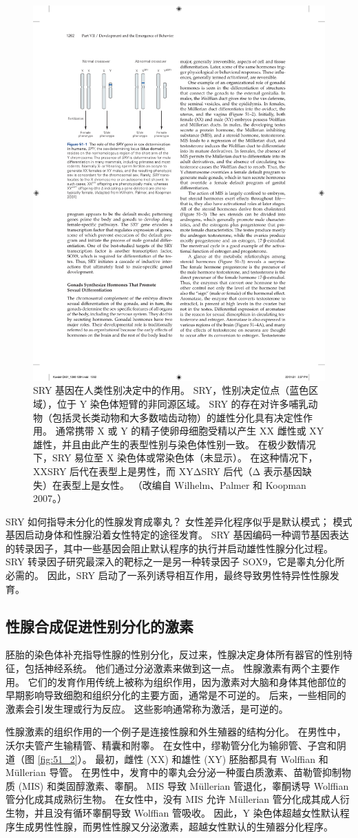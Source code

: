 \begin{figure}[htbp]
	\centering
	\includegraphics[width=0.5\linewidth]{chap51/fig_51_1}
	\caption{SRY 基因在人类性别决定中的作用。 SRY，性别决定位点（蓝色区域），位于 Y 染色体短臂的非同源区域。 SRY 的存在对许多哺乳动物（包括灵长类动物和大多数啮齿动物）的雄性分化具有决定性作用。 通常携带 X 或 Y 的精子使卵母细胞受精以产生 XX 雌性或 XY 雄性，并且由此产生的表型性别与染色体性别一致。 在极少数情况下，SRY 易位至 X 染色体或常染色体（未显示）。 在这种情况下，XXSRY 后代在表型上是男性，而 XYΔSRY 后代（Δ 表示基因缺失）在表型上是女性。 （改编自 Wilhelm、Palmer 和 Koopman 2007。）}
	\label{fig:51_1}
\end{figure}

SRY 如何指导未分化的性腺发育成睾丸？ 女性差异化程序似乎是默认模式； 模式基因启动身体和性腺沿着女性特定的途径发育。 SRY 基因编码一种调节基因表达的转录因子，其中一些基因会阻止默认程序的执行并启动雄性性腺分化过程。 SRY 转录因子研究最深入的靶标之一是另一种转录因子 SOX9，它是睾丸分化所必需的。 因此，SRY 启动了一系列诱导相互作用，最终导致男性特异性性腺发育。

\subsection{性腺合成促进性别分化的激素}
胚胎的染色体补充指导性腺的性别分化，反过来，性腺决定身体所有器官的性别特征，包括神经系统。 他们通过分泌激素来做到这一点。 性腺激素有两个主要作用。 它们的发育作用传统上被称为组织作用，因为激素对大脑和身体其他部位的早期影响导致细胞和组织分化的主要方面，通常是不可逆的。 后来，一些相同的激素会引发生理或行为反应。 这些影响通常称为激活，是可逆的。

性腺激素的组织作用的一个例子是连接性腺和外生殖器的结构分化。 在男性中，沃尔夫管产生输精管、精囊和附睾。 
在女性中，缪勒管分化为输卵管、子宫和阴道（图 \ref{fig:51_2}）。 
最初，雌性 (XX) 和雄性 (XY) 胚胎都具有 Wolffian 和 Müllerian 导管。 在男性中，发育中的睾丸会分泌一种蛋白质激素、苗勒管抑制物质 (MIS) 和类固醇激素、睾酮。 MIS 导致 Müllerian 管退化，睾酮诱导 Wolffian 管分化成其成熟衍生物。 在女性中，没有 MIS 允许 Müllerian 管分化成其成人衍生物，并且没有循环睾酮导致 Wolffian 管吸收。 因此，Y 染色体超越女性默认程序生成男性性腺，而男性性腺又分泌激素，超越女性默认的生殖器分化程序。

